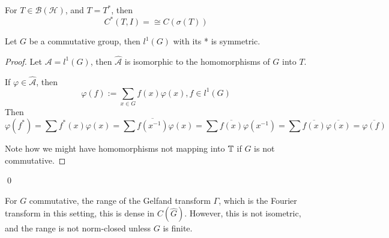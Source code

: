 For $T\in\mathcal{B}(\mathcal{H})$, and $T=T^*$, then
\begin{equation*}
    C^*(T,I)=\cong C(\sigma(T))
\end{equation*}

\begin{proposition}
    Let $G$ be a commutative group, then $l^1(G)$ with its * is symmetric.
\end{proposition}
\begin{proof}
    Let $\mathcal{A}=l^1(G)$, then $\widehat{\mathcal{A}}$ is isomorphic to the homomorphisms of $G$ into $T$.

    If $\varphi\in\widehat{\mathcal{A}}$, then
    \begin{equation*}
        \varphi(f):=\sum_{x\in G} f(x)\varphi(x), f\in l^1(G)
    \end{equation*}
    Then \begin{equation*}
        \varphi(f^*)=\sum f^*(x)\varphi(x)=\sum\overline{f(x^{-1})}\varphi(x)=\sum\overline{f(x)}\varphi(x^{-1})=\sum\overline{f(x)}\overline{\varphi(x)}=\overline{\varphi(f)}
    \end{equation*}

    Note how we might have homomorphisms not mapping into $\mathbb{T}$ if $G$ is not commutative.
\end{proof}
\qed

\begin{proposition}
    For $G$ commutative, the range of the Gelfand transform $\Gamma$, which is the Fourier transform in this setting, this is dense in $C(\widehat{G})$. However, this is not isometric, and the range is not norm-closed unless $G$ is finite.
\end{proposition}
